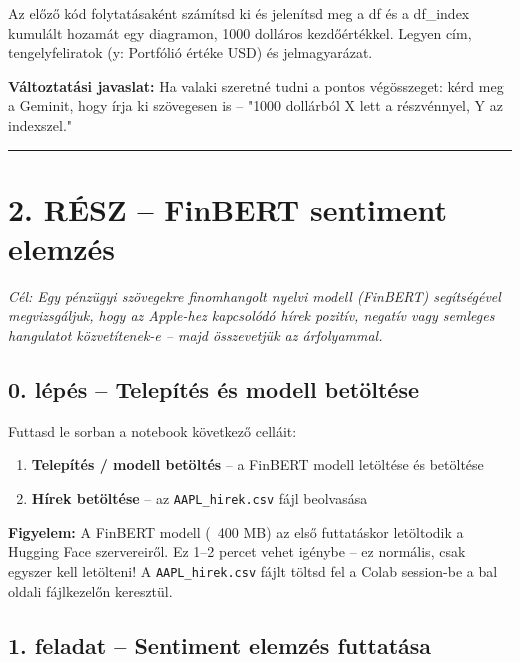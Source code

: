 \documentclass[11pt,a4paper]{article}
\newcommand{\warn}[1]{%
  \vspace{3pt}%
  \begin{tcolorbox}[warnstyle]%
  \textbf{\textcolor{warnborder}{Figyelem:}} #1%
  \end{tcolorbox}\vspace{2pt}}
\newcommand{\note}[1]{%
  \vspace{3pt}%
  \begin{tcolorbox}[notestyle]%
  \textbf{\textcolor{noteborder}{Változtatási javaslat:}} #1%
  \end{tcolorbox}\vspace{2pt}}
\begin{document}
\begin{prompt}
Az előző kód folytatásaként számítsd ki és jelenítsd meg a df és a df_index
kumulált hozamát egy diagramon, 1000 dolláros kezdőértékkel.
Legyen cím, tengelyfeliratok (y: Portfólió értéke USD) és jelmagyarázat.
\end{prompt}

\note{Ha valaki szeretné tudni a pontos végösszeget: kérd meg a Geminit, hogy
írja ki szövegesen is -- "1000 dollárból X lett a részvénnyel, Y az indexszel."}

\bigskip\noindent\rule{\linewidth}{0.4pt}\bigskip

\section{2. RÉSZ -- FinBERT sentiment elemzés}

\noindent\textit{Cél: Egy pénzügyi szövegekre finomhangolt nyelvi modell (FinBERT)
segítségével megvizsgáljuk, hogy az Apple-hez kapcsolódó hírek pozitív,
negatív vagy semleges hangulatot közvetítenek-e -- majd összevetjük az árfolyammal.}

\bigskip

\subsection{0. lépés -- Telepítés és modell betöltése}

\noindent Futtasd le sorban a notebook következő celláit:

\begin{enumerate}[noitemsep, topsep=4pt]
  \item \textbf{Telepítés / modell betöltés} -- a FinBERT modell letöltése és betöltése
  \item \textbf{Hírek betöltése} -- az \texttt{AAPL\_hirek.csv} fájl beolvasása
\end{enumerate}

\warn{A FinBERT modell (~400 MB) az első futtatáskor letöltodik a Hugging Face szervereiről.
Ez 1--2 percet vehet igénybe -- ez normális, csak egyszer kell letölteni!
A \texttt{AAPL\_hirek.csv} fájlt töltsd fel a Colab session-be a bal oldali fájlkezelőn keresztül.}

\bigskip

\subsection{1. feladat -- Sentiment elemzés futtatása}
\end{document}
